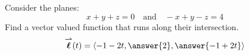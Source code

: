 \documentclass{ximera}
\author{Bart Snapp}
\begin{document}
\begin{exercise}
Consider the planes:
\[
x+y+z=0\quad\text{and}\quad-x+y-z=4
\]
Find a vector valued function that runs along their intersection.
\[
\vecl(t) = \vector{-1-2t,\answer{2},\answer{-1+2t}}
\]
\end{exercise}
\end{document}
